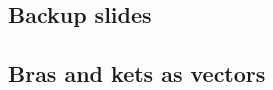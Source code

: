 \documentclass[10pt]{beamer}
\begin{document}
\appendix

\begin{frame}
  \section{Backup slides}
\end{frame}
\begin{frame}
  \section{Bras and kets as vectors}
\end{frame}
\end{document}
